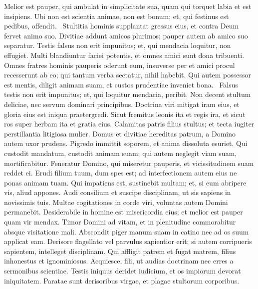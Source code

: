 \begin{biblechapter}
\begin{biblechapter}
\begin{biblechapter}
\begin{biblechapter}
\begin{biblechapter}
\begin{biblechapter}
\begin{biblechapter}
\begin{biblechapter}
\begin{biblechapter}
\begin{biblechapter}
\begin{biblechapter}
\begin{biblechapter}
\begin{biblechapter}
\begin{biblechapter}
\begin{biblechapter}
\begin{biblechapter}
\begin{biblechapter}
\begin{biblechapter}
\begin{biblechapter}
 \verse Melior est pauper, qui ambulat in simplicitate sua,
 quam qui torquet labia et est insipiens.
 \verse Ubi non est scientia animae, non est bonum;
 et, qui festinus est pedibus, offendit. 
 \verse Stultitia hominis supplantat gressus eius,
 et contra Deum fervet animo suo.
 \verse Divitiae addunt amicos plurimos;
 pauper autem ab amico suo separatur.
 \verse Testis falsus non erit impunitus;
 et, qui mendacia loquitur, non effugiet.
 \verse Multi blandiuntur faciei potentis,
 et omnes amici sunt dona tribuenti.
 \verse Omnes fratres hominis pauperis oderunt eum,
 insuverse per et amici procul recesserunt ab eo;
 qui tantum verba sectatur, nihil habebit.
 \verse Qui autem possessor est mentis, diligit animam suam,
 et custos prudentiae inveniet bona. 
 \verse Falsus testis non erit impunitus;
 et, qui loquitur mendacia, peribit.
 \verse Non decent stultum deliciae,
 nec servum dominari principibus.
 \verse Doctrina viri mitigat iram eius,
 et gloria eius est iniqua praetergredi.
 \verse Sicut fremitus leonis ita et regis ira,
 et sicut ros super herbam ita et gratia eius.
 \verse Calamitas patris filius stultus;
 et tecta iugiter perstillantia litigiosa mulier.
 \verse Domus et divitiae hereditas patrum,
 a Domino autem uxor prudens.
 \verse Pigredo immittit soporem,
 et anima dissoluta esuriet.
 \verse Qui custodit mandatum, custodit animam suam;
 qui autem neglegit viam suam, mortificabitur.
 \verse Feneratur Domino, qui miseretur pauperis,
 et vicissitudinem suam reddet ei.
 \verse Erudi filium tuum, dum spes est;
 ad interfectionem autem eius ne ponas animam tuam.
 \verse Qui impatiens est, sustinebit multam;
 et, si eum abripere vis, aliud appones.
 \verse Audi consilium et suscipe disciplinam,
 ut sis sapiens in novissimis tuis.
 \verse Multae cogitationes in corde viri,
 voluntas autem Domini permanebit.
 \verse Desiderabile in homine est misericordia eius;
 et melior est pauper quam vir mendax.
 \verse Timor Domini ad vitam,
 et in plenitudine commorabitur absque visitatione mali.
 \verse Abscondit piger manum suam in catino
 nec ad os suum applicat eam.
 \verse Derisore flagellato vel parvulus sapientior erit;
 si autem corripueris sapientem, intelleget disciplinam.
 \verse Qui affligit patrem et fugat matrem,
 filius inhonestus et ignominiosus.
 \verse Acquiesce, fili, ut audias doctrinam
 nec erres a sermonibus scientiae.
 \verse Testis iniquus deridet iudicium,
 et os impiorum devorat iniquitatem.
 \verse Paratae sunt derisoribus virgae,
 et plagae stultorum corporibus.
 

\end{biblechapter}
\end{biblechapter}
\end{biblechapter}
\end{biblechapter}
\end{biblechapter}
\end{biblechapter}
\end{biblechapter}
\end{biblechapter}
\end{biblechapter}
\end{biblechapter}
\end{biblechapter}
\end{biblechapter}
\end{biblechapter}
\end{biblechapter}
\end{biblechapter}
\end{biblechapter}
\end{biblechapter}
\end{biblechapter}
\end{biblechapter}
